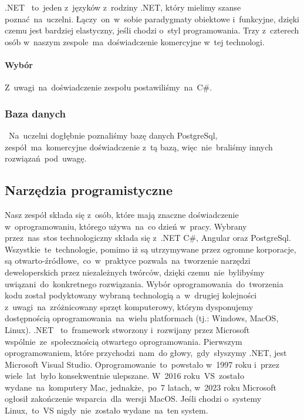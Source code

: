 \indent .NET ~to~jeden z~języków z~rodziny .NET, który mielimy szanse poznać~na~uczelni.
Łączy~on~w~sobie paradygmaty obiektowe i~funkcyjne, dzięki czemu jest bardziej elastyczny, jeśli chodzi o~styl programowania.
Trzy z~czterech osób w~naszym zespole~ma~doświadczenie komercyjne w~tej technologi.

\paragraph{Wybór}
Z~uwagi~na~doświadczenie zespołu postawiliśmy~na~C\#.

\subsubsection{Baza danych}~Na~uczelni dogłębnie poznaliśmy bazę danych PostgreSql, zespół~ma~komercyjne doświadczenie z~tą bazą, więc~nie~braliśmy innych rozwiązań~pod~uwagę.

\subsection{Narzędzia programistyczne}
\label{subsec:narzedzia-programistyczne}
\indent Nasz zespół składa się z~osób, które mają znaczne doświadczenie w~oprogramowaniu, którego używa~na~co dzień w~pracy.
Wybrany przez~nas~stos technologiczny składa się z~.NET C\#, Angular oraz PostgreSql.
Wszystkie~te~technologie, pomimo iż są utrzymywane przez ogromne korporacje, są otwarto-źródłowe,~co~w~praktyce pozwala~na~tworzenie narzędzi deweloperskich przez niezależnych twórców, dzięki czemu~nie~bylibyśmy uwiązani~do~konkretnego rozwiązania.
Wybór oprogramowania~do~tworzenia kodu został podyktowany wybraną technologią a~w~drugiej kolejności z~uwagi~na~zróżnicowany sprzęt komputerowy, którym dysponujemy  dostępnością oprogramowania~na~wielu platformach (tj.: Windows, MacOS, Linux).
\indent .NET ~to~framework stworzony i~rozwijany przez Microsoft wspólnie~ze~społecznością otwartego oprogramowania.
Pierwszym oprogramowaniem, które przychodzi~nam~do głowy,~gdy~słyszymy .NET, jest Microsoft Visual Studio.
Oprogramowanie~to~powstało w~1997 roku i~przez wiele~lat~było konsekwentnie ulepszane.
W~2016 roku~VS~zostało wydane~na~komputery Mac, jednakże,~po~7 latach, w~2023 roku Microsoft ogłosił zakończenie wsparcia~dla~wersji MacOS.
Jeśli chodzi o~systemy Linux,~to~VS nigdy~nie~zostało wydane~na~ten system.

